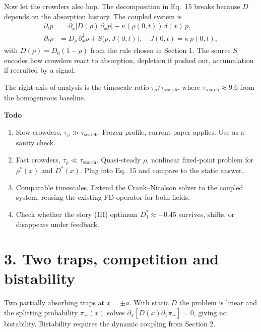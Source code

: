 \documentclass[11pt]{article}
\begin{document}
Now let the crowders also hop. The decomposition in Eq.~15 breaks because $D$ depends on the absorption history. The coupled system is
\begin{align*}
\partial_t p &= \partial_x\!\big[D(\rho)\,\partial_x p\big] - \kappa(\rho(0,t))\,\delta(x)\,p, \\
\partial_t \rho &= D_\rho\,\partial_x^2 \rho + S\big(p, J(0,t)\big), \quad J(0,t) = \kappa\,p(0,t),
\end{align*}
with $D(\rho) = D_0(1-\rho)$ from the rule chosen in Section 1. The source $S$ encodes how crowders react to absorption, depletion if pushed out, accumulation if recruited by a signal.

The right axis of analysis is the timescale ratio $\tau_\rho / \tau_{\text{search}}$, where $\tau_{\text{search}} \approx 9.6$ from the homogeneous baseline.

\textbf{Todo}
\begin{enumerate}
  \item Slow crowders, $\tau_\rho \gg \tau_{\text{search}}$. Frozen profile, current paper applies. Use as a sanity check.
  \item Fast crowders, $\tau_\rho \ll \tau_{\text{search}}$. Quasi-steady $\rho$, nonlinear fixed-point problem for $\rho^*(x)$ and $D^*(x)$. Plug into Eq.~15 and compare to the static answer.
  \item Comparable timescales. Extend the Crank--Nicolson solver to the coupled system, reusing the existing FD operator for both fields.
  \item Check whether the story (III) optimum $D_1^* \approx -0.45$ survives, shifts, or disappears under feedback.
\end{enumerate}

\section*{3. Two traps, competition and bistability}

Two partially absorbing traps at $x = \pm a$. With static $D$ the problem is linear and the splitting probability $\pi_+(x)$ solves $\partial_x[D(x)\partial_x \pi_+] = 0$, giving no bistability. Bistability requires the dynamic coupling from Section 2.
\end{document}
